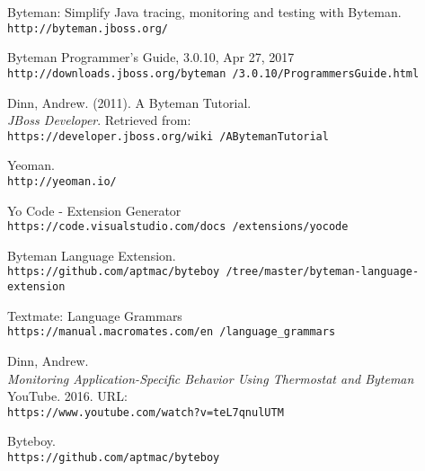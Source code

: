 \documentclass[letterpaper,twocolumn,10pt]{article}
\begin{document}
\begin{thebibliography}{99}

Byteman: Simplify Java tracing, monitoring and testing with Byteman.
\\\texttt{http://byteman.jboss.org/}

Byteman Programmer's Guide, 3.0.10, Apr 27, 2017
\\\texttt{http://downloads.jboss.org/byteman
/3.0.10/ProgrammersGuide.html}

Dinn, Andrew. (2011). A Byteman Tutorial. \\\textit{JBoss Developer}. Retrieved from: 
\\\texttt{https://developer.jboss.org/wiki
/ABytemanTutorial}

Yeoman.
\\\texttt{http://yeoman.io/}

Yo Code - Extension Generator
\\\texttt{https://code.visualstudio.com/docs
/extensions/yocode}

Byteman Language Extension.
\\\texttt{https://github.com/aptmac/byteboy
/tree/master/byteman-language-extension}

Textmate: Language Grammars
\\\texttt{https://manual.macromates.com/en
/language\_grammars}

Dinn, Andrew. \\\textit{Monitoring Application-Specific Behavior Using Thermostat and Byteman}
YouTube. 2016. URL: \\\texttt{https://www.youtube.com/watch?v=teL7qnulUTM}

Byteboy.
\\\texttt{https://github.com/aptmac/byteboy}

\end{thebibliography}
\end{document}

